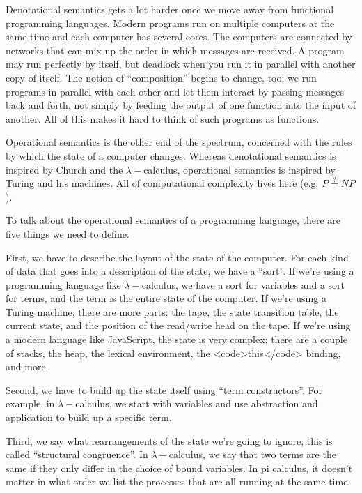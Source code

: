 \documentclass[a4paper,UKenglish]{article}
\begin{document}
Denotational semantics gets a lot harder once we move away from functional programming languages.  Modern programs run on multiple computers at the same time and each computer has several cores. The computers are connected by networks that can mix up the order in which messages are received.  A program may run perfectly by itself, but deadlock when you run it in parallel with another copy of itself.  The notion of ``composition'' begins to change, too: we run programs in parallel with each other and let them interact by passing messages back and forth, not simply by feeding the output of one function into the input of another.  All of this makes it hard to think of such programs as functions.

Operational semantics is the other end of the spectrum, concerned with the rules by which the state of a computer changes.  Whereas denotational semantics is inspired by Church and the $\lambda-$calculus, operational semantics is inspired by Turing and his machines.  All of computational complexity lives here (e.g. $P \stackrel{?}{=} NP$).

To talk about the operational semantics of a programming language, there are five things we need to define.

First, we have to describe the layout of the state of the computer. For each kind of data that goes into a description of the state, we have a ``sort''.  If we're using a programming language like $\lambda-$calculus, we have a sort for variables and a sort for terms, and the term is the entire state of the computer.  If we're using a Turing machine, there are more parts: the tape, the state transition table, the current state, and the position of the read/write head on the tape.  If we're using a modern language like JavaScript, the state is very complex: there are a couple of stacks, the heap, the lexical environment, the <code>this</code> binding, and more.

Second, we have to build up the state itself using ``term constructors''.  For example, in $\lambda-$calculus, we start with variables and use abstraction and application to build up a specific term.

Third, we say what rearrangements of the state we're going to ignore; this is called ``structural congruence''.  In $\lambda-$calculus, we say that two terms are the same if they only differ in the choice of bound variables.  In pi calculus, it doesn't matter in what order we list the processes that are all running at the same time.
\end{document}
